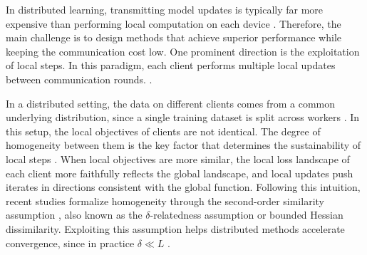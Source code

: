 \documentclass{article}
\begin{document}
In distributed learning, transmitting model updates is typically far more expensive than 
performing local computation on each device 
\citep{konevcny2016federated, kairouz2021advances}. Therefore, the main 
challenge is to design methods that achieve superior performance while 
keeping the communication cost low.  One prominent direction  is the exploitation of local steps. In this paradigm,  each client performs 
multiple local updates between communication rounds. \citep{mcmahan2017communication, khaled2020tighter, 
woodworth2020minibatch, li2020federated}. 









In a distributed setting, the data on different clients comes
from a common underlying distribution, since a single training dataset is split across workers \cite{zinkevich2010parallelized, dekel2012optimal}. In this setup, 
the local objectives of clients are not identical. The degree of homogeneity 
between them is the key factor that determines the sustainability of local 
steps \cite{karimireddy2020scaffold, woodworth2020minibatch}. When local 
objectives are more similar, the local loss landscape of each client more 
faithfully reflects the global landscape, and local updates push iterates 
in directions consistent with the global function. Following this intuition, recent 
studies formalize homogeneity through the second-order similarity assumption 
\citep{kovalev2022optimal, lin2023stochastic, karagulyan2024spamstochasticproximalpoint}, 
also known as the $\delta$-relatedness assumption or bounded Hessian dissimilarity. Exploiting this assumption helps distributed methods accelerate convergence, since in practice $\delta \ll L$ \cite{arjevani2015communication, kovalev2022optimal}.
\end{document}

